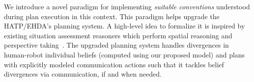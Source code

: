 \documentclass[letterpaper]{article} %
\begin{document}


We introduce a novel paradigm for implementing \textit{suitable conventions} understood during plan execution in this context. This paradigm helps upgrade the HATP/EHDA's planning system. 
A high-level idea to formalize it is inspired by existing situation assessment reasoners which perform spatial reasoning and perspective taking~\cite{flavell1992perspectives,trafton2005enabling,johnson2005perceptual,Sisbot2011SituationAF,warnier-2012,lemaignan-2017}. 
The upgraded planning system handles divergences in human-robot individual beliefs (computed using our proposed model) and plans with explicitly modeled communication actions such that it tackles belief divergences via communication, if and when needed.

\end{document}
